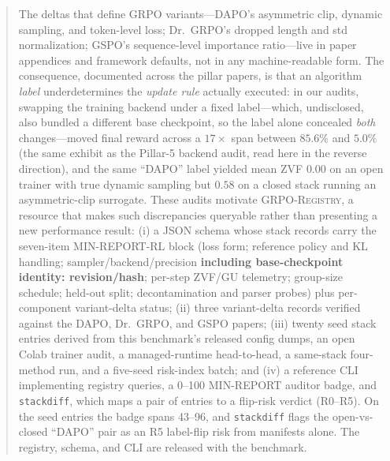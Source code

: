 \begin{abstract}
The deltas that define GRPO variants---DAPO's asymmetric clip, dynamic sampling,
and token-level loss; Dr.~GRPO's dropped length and std normalization; GSPO's
sequence-level importance ratio---live in paper appendices and framework
defaults, not in any machine-readable form. The consequence, documented across
the \ours{} pillar papers, is that an algorithm \emph{label} underdetermines the
\emph{update rule} actually executed: in our audits, swapping the training backend
under a fixed label---which, undisclosed, also bundled a different base checkpoint,
so the label alone concealed \emph{both} changes---moved final reward across a
$17\times$ span between $85.6\%$ and $5.0\%$ (the same exhibit as the Pillar-5
backend audit, read here in the reverse direction),
and the same ``DAPO'' label yielded mean ZVF $0.00$ on an open trainer with true
dynamic sampling but $0.58$ on a closed stack running an asymmetric-clip
surrogate. These audits motivate \textsc{GRPO-Registry}, a resource that makes
such discrepancies queryable rather than presenting a new performance result:
(i) a JSON schema whose stack records carry the
seven-item MIN-REPORT-RL block (loss form; reference policy and KL handling;
sampler/backend/precision \textbf{including base-checkpoint identity: revision/hash};
per-step ZVF/GU telemetry; group-size schedule;
held-out split; decontamination and parser probes) plus per-component
variant-delta status; (ii) three variant-delta records verified against the
DAPO, Dr.~GRPO, and GSPO papers; (iii) twenty seed stack entries derived from
this benchmark's released config dumps, an open Colab trainer audit, a
managed-runtime head-to-head, a same-stack four-method run, and a five-seed
risk-index batch; and (iv) a reference CLI implementing registry
queries, a 0--100 MIN-REPORT auditor badge, and \texttt{stackdiff}, which maps a
pair of entries to a flip-risk verdict (R0--R5). On the seed entries the badge
spans 43--96, and \texttt{stackdiff} flags the open-vs-closed ``DAPO'' pair as
an R5 label-flip risk from manifests alone. The registry, schema, and CLI are
released with the benchmark.
\end{abstract}
